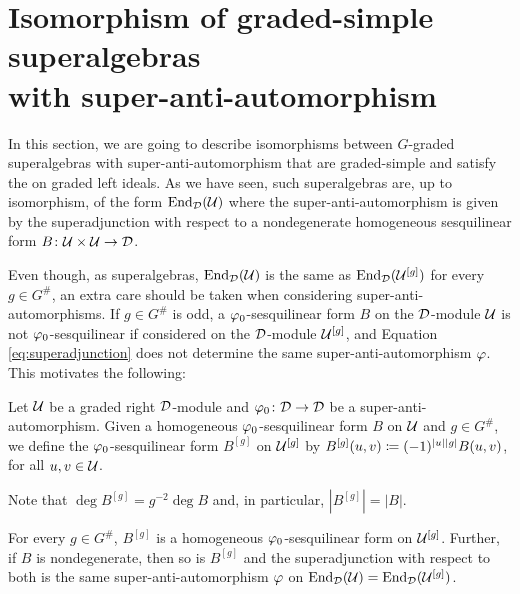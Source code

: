 \section{Isomorphism of graded-simple superalgebras\texorpdfstring{\\}{} with super-anti-automorphism}\label{sec:iso-vphi-abstract}

In this section, we are going to describe isomorphisms between $G$-graded superalgebras with super-anti-automorphism that are graded-simple and satisfy the \dcc on graded left ideals.
As we have seen, such superalgebras are, up to isomorphism, of the form $\operatorname{End}_{\mathcal{D}} (\mathcal U)$ where the super-anti-automorphism is given by the superadjunction with respect to a nondegenerate homogeneous sesquilinear form $B\colon \mathcal U \times \mathcal U \to \mathcal{D}$.

Even though, as superalgebras, $\operatorname{End}_{\mathcal{D}}( \mathcal U )$ is the same as $\operatorname{End}_{\mathcal{D}}( \mathcal U^{[g]} )$ for every $g \in G^\#$, an extra care should be taken when considering super-anti-automorphisms.
If $g\in G^\#$ is odd, a $\varphi_0$-sesquilinear form $B$ on the $\mathcal{D}$-module $\mathcal U$ is not $\varphi_0$-sesquilinear if considered on the $\mathcal{D}$-module $\mathcal U^{[g]}$, and Equation \eqref{eq:superadjunction} does not determine the same super-anti-automorphism $\varphi$.
This motivates the following:

\begin{defi}\label{defi:shift-on-B}
	Let $\mathcal U$ be a graded right $\mathcal{D}$-module and $\varphi_0\colon \mathcal{D} \to \mathcal{D}$ be a super-anti-automorphism.
	Given a homogeneous $\varphi_0$-sesquilinear form $B$ on $\mathcal U$ and $g\in G^\#$, we define the $\varphi_0$-sesquilinear form  $B^{[g]}$ on $\mathcal U^{[g]}$ by $B^{[g]}(u,v) \coloneqq (-1)^{|u||g|} B(u,v)$, for all $u,v \in \mathcal U$.
\end{defi}

\begin{remark}\label{rmk:deg-B^[g]}
	Note that $\deg B^{[g]} = g^{-2} \deg B$ and, in particular, $|B^{[g]}| = |B|$.
\end{remark}

\begin{lemma}\label{lemma:B^[b]-does-the-job}
	For every $g\in G^\#$, $B^{[g]}$ is a homogeneous $\varphi_0$-sesquilinear form on $\mathcal U^{[g]}$.
	Further, if $B$ is nondegenerate, then so is $B^{[g]}$ and the superadjunction with respect to both is the same super-anti-automorphism $\varphi$ on $\operatorname{End}_{\mathcal{D}}(\mathcal U) = \operatorname{End}_{\mathcal{D}}(\mathcal U^{[g]})$.
\end{lemma}

